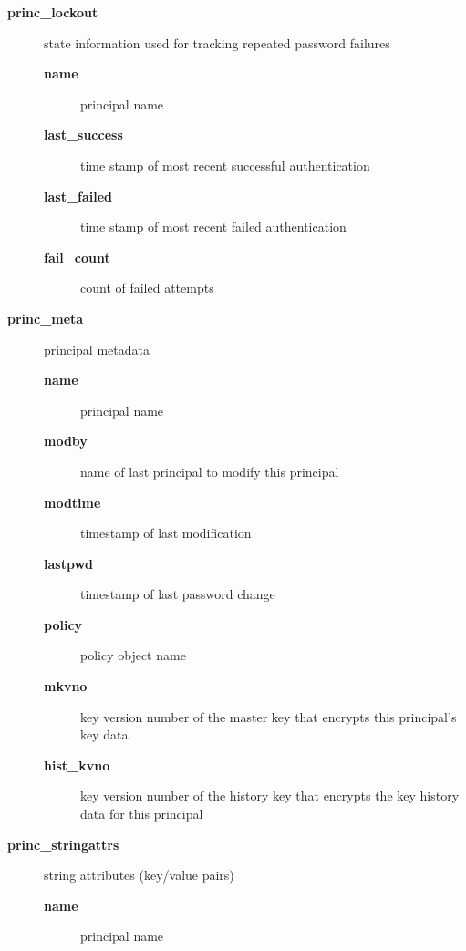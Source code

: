\documentclass[letterpaper,10pt,english]{sphinxmanual}
\begin{document}
\begin{description}
\item[{\textbf{princ\_lockout}}] \leavevmode
state information used for tracking repeated password failures
\begin{description}
\item[{\textbf{name}}] \leavevmode
principal name

\item[{\textbf{last\_success}}] \leavevmode
time stamp of most recent successful authentication

\item[{\textbf{last\_failed}}] \leavevmode
time stamp of most recent failed authentication

\item[{\textbf{fail\_count}}] \leavevmode
count of failed attempts

\end{description}

\item[{\textbf{princ\_meta}}] \leavevmode
principal metadata
\begin{description}
\item[{\textbf{name}}] \leavevmode
principal name

\item[{\textbf{modby}}] \leavevmode
name of last principal to modify this principal

\item[{\textbf{modtime}}] \leavevmode
timestamp of last modification

\item[{\textbf{lastpwd}}] \leavevmode
timestamp of last password change

\item[{\textbf{policy}}] \leavevmode
policy object name

\item[{\textbf{mkvno}}] \leavevmode
key version number of the master key that encrypts this
principal's key data

\item[{\textbf{hist\_kvno}}] \leavevmode
key version number of the history key that encrypts the key
history data for this principal

\end{description}

\item[{\textbf{princ\_stringattrs}}] \leavevmode
string attributes (key/value pairs)
\begin{description}
\item[{\textbf{name}}] \leavevmode
principal name


\end{description}
\end{description}
\end{document}
